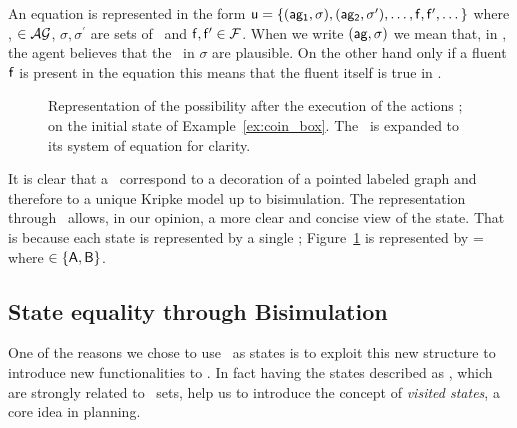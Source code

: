 	An equation is represented in the form $\poss{u} = \bra{(\agent{ag_1}, \sigma), (\agent{ag_2}, \sigma^\prime), \dots ,\defemph{f}, \defemph{f}^\prime , \dots}$ where ,  $\in \mathcal{AG}$, $\sigma, \sigma^\prime$ are sets of \posS\ and $\mathsf{f}, \mathsf{f}^\prime \in \mathcal{F}$.
	When we write $ (\agent{ag}, \sigma)$ we mean that, in , the agent  believes that the \posS\ in $\sigma$ are plausible.
	On the other hand only if a fluent $\mathsf{f}$ is present in the equation this means that the fluent itself is true in .
	\begin{figure}
		\centering
		\caption{Representation of the possibility  after the execution of the actions ; on the initial state of Example~\ref{ex:coin_box}. The \pos\ is expanded to its system of equation for clarity.}
		\label{fig:state_as_pos}
	\end{figure}%
%	

	It is clear that a \pos\ correspond to a decoration of a pointed labeled graph and therefore to a unique Kripke model up to bisimulation.
	The representation through \posS\ allows, in our opinion, a more clear and concise view of the state. That is because each state is represented by a single \pos;
	\eg Figure~\ref{fig:state_as_pos} is represented by =  where  $\in \bra{\agent{A}, \agent{B}}$.
%
%
%
\FloatBarrier
\subsection{State equality through Bisimulation} \label{subsec-contribution:bisim}
\FloatBarrier

	One of the reasons we chose to use \posS\ as states is to exploit this new structure to introduce new functionalities to \mep.
	In fact having the states described as \posS, which are strongly related to \nwf\ sets, help us to introduce the concept of \emph{visited states}, a core idea in planning.
	
